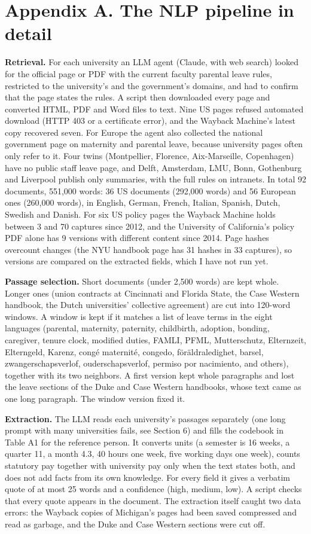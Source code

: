 \documentclass[10pt,twocolumn]{article}
\begin{document}
\section*{Appendix A. The NLP pipeline in detail}
\textbf{Retrieval.} For each university an LLM agent (Claude, with web search) looked for the official page or PDF with the current faculty parental leave rules, restricted to the university's and the government's domains, and had to confirm that the page states the rules. A script then downloaded every page and converted HTML, PDF and Word files to text. Nine US pages refused automated download (HTTP 403 or a certificate error), and the Wayback Machine's latest copy recovered seven. For Europe the agent also collected the national government page on maternity and parental leave, because university pages often only refer to it. Four twins (Montpellier, Florence, Aix-Marseille, Copenhagen) have no public staff leave page, and Delft, Amsterdam, LMU, Bonn, Gothenburg and Liverpool publish only summaries, with the full rules on intranets. In total 92 documents, 551,000 words: 36 US documents (292,000 words) and 56 European ones (260,000 words), in English, German, French, Italian, Spanish, Dutch, Swedish and Danish. For six US policy pages the Wayback Machine holds between 3 and 70 captures since 2012, and the University of California's policy PDF alone has 9 versions with different content since 2014. Page hashes overcount changes (the NYU handbook page has 31 hashes in 33 captures), so versions are compared on the extracted fields, which I have not run yet.

\textbf{Passage selection.} Short documents (under 2,500 words) are kept whole. Longer ones (union contracts at Cincinnati and Florida State, the Case Western handbook, the Dutch universities' collective agreement) are cut into 120-word windows. A window is kept if it matches a list of leave terms in the eight languages (parental, maternity, paternity, childbirth, adoption, bonding, caregiver, tenure clock, modified duties, FAMLI, PFML, Mutterschutz, Elternzeit, Elterngeld, Karenz, congé maternité, congedo, föräldraledighet, barsel, zwangerschapsverlof, ouderschapsverlof, permiso por nacimiento, and others), together with its two neighbors. A first version kept whole paragraphs and lost the leave sections of the Duke and Case Western handbooks, whose text came as one long paragraph. The window version fixed it.

\textbf{Extraction.} The LLM reads each university's passages separately (one long prompt with many universities fails, see Section 6) and fills the codebook in Table A1 for the reference person. It converts units (a semester is 16 weeks, a quarter 11, a month 4.3, 40 hours one week, five working days one week), counts statutory pay together with university pay only when the text states both, and does not add facts from its own knowledge. For every field it gives a verbatim quote of at most 25 words and a confidence (high, medium, low). A script checks that every quote appears in the document. The extraction itself caught two data errors: the Wayback copies of Michigan's pages had been saved compressed and read as garbage, and the Duke and Case Western sections were cut off.
\end{document}
